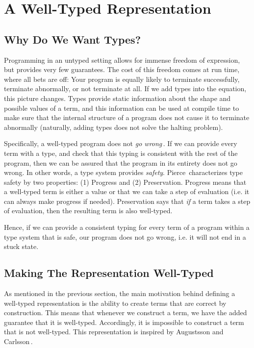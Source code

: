 \section{A Well-Typed Representation}
\label{sec:a-well-typed-expression-language}

\subsection{Why Do We Want Types?}
Programming in an untyped setting allows for immense freedom of expression, but provides very few guarantees. The cost of this freedom comes at run time, where all bets are off: Your program is equally likely to terminate successfully, terminate abnormally, or not terminate at all. If we add types into the equation, this picture changes. Types provide static information about the shape and possible values of a term, and this information can be used at compile time to make sure that the internal structure of a program does not cause it to terminate abnormally (naturally, adding types does not solve the halting problem).

Specifically, a well-typed program does not \emph{go wrong}\,\cite{Milner78atheory}. If we can provide every term with a type, and check that this typing is consistent with the rest of the program, then we can be assured that the program in its entirety does not go wrong. In other words, a type system provides \emph{safety}. Pierce\,\cite[Section~8.3]{Pierce:TypeSystems} characterizes type safety by two properties: (1) Progress and (2) Preservation. Progress means that a well-typed term is either a value or that we can take a step of evaluation (i.e. it can always make progress if needed). Preservation says that \emph{if} a term takes a step of evaluation, then the resulting term is also well-typed.

Hence, if we can provide a consistent typing for every term of a program within a type system that is safe, our program does not go wrong, i.e. it will not end in a stuck state. 

\subsection{Making The Representation Well-Typed}
As mentioned in the previous section, the main motivation behind defining a well-typed representation is the ability to create terms that are correct by construction. This means that whenever we construct a term, we have the added guarantee that it is well-typed. Accordingly, it is impossible to construct a term that is not well-typed. This representation is inspired by Augustsson and Carlsson\,\cite{Augustsson99anexercise}.

